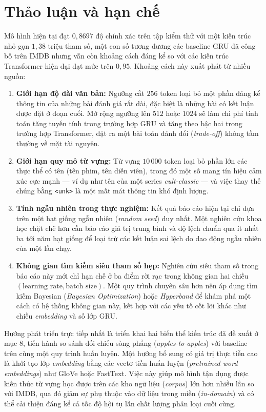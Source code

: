 \section{Thảo luận và hạn chế}

Mô hình hiện tại đạt $0,8697$ độ chính xác trên tập kiểm thử với một kiến trúc nhỏ gọn $1,38$ triệu tham số, một con số tương đương các baseline GRU đã công bố trên IMDB nhưng vẫn còn khoảng cách đáng kể so với các kiến trúc Transformer hiện đại đạt mức trên $0,95$. Khoảng cách này xuất phát từ nhiều nguồn:

\begin{enumerate}
    \item \textbf{Giới hạn độ dài văn bản:} Ngưỡng cắt $256$ token loại bỏ một phần đáng kể thông tin của những bài đánh giá rất dài, đặc biệt là những bài có kết luận được đặt ở đoạn cuối. Mở rộng ngưỡng lên $512$ hoặc $1024$ sẽ làm chi phí tính toán tăng tuyến tính trong trường hợp GRU và tăng theo bậc hai trong trường hợp Transformer, đặt ra một bài toán đánh đổi (\textit{trade-off}) không tầm thường về mặt tài nguyên.
    \item \textbf{Giới hạn quy mô từ vựng:} Từ vựng $10\,000$ token loại bỏ phần lớn các thực thể có tên (tên phim, tên diễn viên), trong đó một số mang tín hiệu cảm xúc cực mạnh — ví dụ như tên của một series \textit{cult-classic} — và việc thay thế chúng bằng \texttt{<unk>} là một mất mát thông tin khó định lượng.
    \item \textbf{Tính ngẫu nhiên trong thực nghiệm:} Kết quả báo cáo hiện tại chỉ dựa trên một hạt giống ngẫu nhiên (\textit{random seed}) duy nhất. Một nghiên cứu khoa học chặt chẽ hơn cần báo cáo giá trị trung bình và độ lệch chuẩn qua ít nhất ba tới năm hạt giống để loại trừ các kết luận sai lệch do dao động ngẫu nhiên của một lần chạy.
    \item \textbf{Không gian tìm kiếm siêu tham số hẹp:} Nghiên cứu siêu tham số trong báo cáo này mới chỉ hạn chế ở ba điểm rời rạc trong không gian hai chiều $(\text{learning rate}, \text{batch size})$. Một quy trình chuyên sâu hơn nên áp dụng tìm kiếm Bayesian (\textit{Bayesian Optimization}) hoặc \textit{Hyperband} để khám phá một cách có hệ thống không gian này, kết hợp với các yếu tố cốt lõi khác như chiều \textit{embedding} và số lớp GRU.
\end{enumerate}

Hướng phát triển trực tiếp nhất là triển khai hai biến thể kiến trúc đã đề xuất ở mục 8, tiến hành so sánh đối chiếu sòng phẳng (\textit{apples-to-apples}) với baseline trên cùng một quy trình huấn luyện. Một hướng bổ sung có giá trị thực tiễn cao là khởi tạo lớp \textit{embedding} bằng các vectơ tiền huấn luyện (\textit{pretrained word embeddings}) như GloVe hoặc FastText. Việc này giúp mô hình tận dụng được kiến thức từ vựng học được trên các kho ngữ liệu (\textit{corpus}) lớn hơn nhiều lần so với IMDB, qua đó giảm sự phụ thuộc vào dữ liệu trong miền (\textit{in-domain}) và có thể cải thiện đáng kể cả tốc độ hội tụ lẫn chất lượng phân loại cuối cùng.